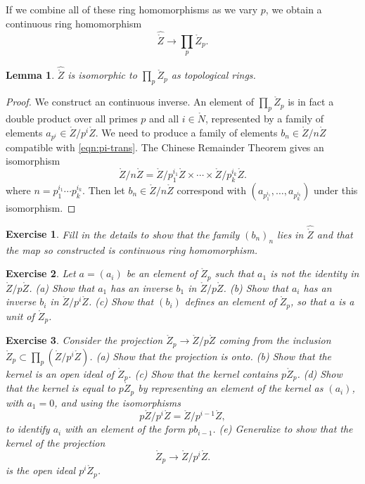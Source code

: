 \documentclass{amsart}
\newtheorem{lemma}[equation]{Lemma}
\newtheorem{exercise}{Exercise}
\begin{document}
If we combine all of these ring homomorphisms as we vary $p$, we obtain a 
continuous ring homomorphism
\[
\hat{\ring{Z}}\to\prod_p \ring{Z}_p.
\]

\begin{lemma}
$\hat{\ring{Z}}$ is isomorphic to $\prod_p \ring{Z}_p$ as topological rings.
\end{lemma}

\begin{proof}
We construct an continuous inverse.
An element of $\prod_p \ring{Z}_p$ is in fact a double product over all primes $p$ and all
$i\in\ring{N}$, represented by a family of elements $a_{p^i}\in\ring{Z}/p^i\ring{Z}$.
We need to produce a family of elements $b_n\in\ring{Z}/n\ring{Z}$ compatible
with \eqref{eqn:pi-trans}.  The Chinese Remainder Theorem 
\cite[page 402]{knapp-basic} gives an isomorphism
\[
\ring{Z}/n\ring{Z} = \ring{Z}/p_1^{i_1}\ring{Z} \times \cdots\times
\ring{Z}/p_k^{i_k}\ring{Z}.
\]
where $n=p_1^{i_1}\cdots p_k^{i_k}$.  Then let $b_n\in\ring{Z}/n\ring{Z}$
correspond with $(a_{p_1^{i_1}},\ldots,a_{p_k^{i_k}})$ under this isomorphism.
\end{proof}

\begin{exercise}
Fill in the details to show that the family $(b_n)_n$ lies in $\hat{\ring{Z}}$ and
that the map so constructed is continuous ring homomorphism.
\end{exercise}

\begin{exercise}
Let $a = (a_i)$ be an element of $\ring{Z}_p$ such that $a_1$ is not the identity
in $\ring{Z}/p\ring{Z}$.  (a) Show that $a_1$ has an inverse $b_1$ in
$\ring{Z}/p\ring{Z}$.  (b) Show that $a_i$ has an inverse $b_i$ in
$\ring{Z}/p^i\ring{Z}$.  (c) Show that $(b_i)$ defines an element of $\ring{Z}_p$,
so that $a$ is a unit of $\ring{Z}_p$.
\end{exercise}

\begin{exercise}  Consider the projection $\ring{Z}_p\to\ring{Z}/p\ring{Z}$
coming from the inclusion $\ring{Z}_p\subset\prod_p (\ring{Z}/p^i\ring{Z})$.
(a) Show that the projection is onto.
(b) Show that the kernel is an open ideal of $\ring{Z}_p$.  (c) Show that
the kernel contains $p\ring{Z}_p$.  (d) Show that the kernel is equal
to $p\ring{Z}_p$ by representing an element of the kernel as $(a_i)$, with $a_1=0$,
and using the isomorphisms
\[
p \ring{Z}/p^i\ring{Z} = \ring{Z}/p^{i-1}\ring{Z},
\]
to identify $a_i$ with an element of the form $p b_{i-1}$.
(e) Generalize to show that the kernel of the projection 
\[
\ring{Z}_p\to\ring{Z}/p^i\ring{Z}.
\]
is the open ideal $p^i\ring{Z}_p$.
\end{exercise}
\end{document}
